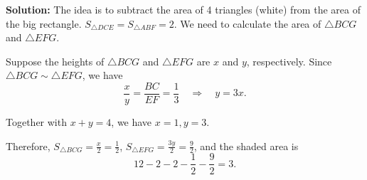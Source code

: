 \documentclass[11pt, oneside]{article}   	%
\begin{document}
\begin{enumerate}
\textbf{Solution:}
The idea is to subtract the area of 4 triangles (white) from the area of the big rectangle. $S_{\triangle DCE} = S_{\triangle ABF}= 2$. We need to calculate the area of $\triangle BCG$ and $\triangle EFG$.

Suppose the heights of $\triangle BCG$ and $\triangle EFG$ are $x$ and $y$, respectively. Since $\triangle BCG \sim \triangle EFG$,  we have 
\[\frac{x}{y}=\frac{BC}{EF}=\frac{1}{3} \quad \Rightarrow \quad y=3x.\]

Together with $x+y=4$, we have $x=1, y=3$. 

Therefore, $S_{\triangle BCG}=\frac{x}{2}=\frac{1}{2}$,  $S_{\triangle EFG}=\frac{3y}{2}=\frac{9}{2}$, and the shaded area is
\[12-2-2-\frac{1}{2}-\frac{9}{2}=3.\]


\end{enumerate}
\end{document}
